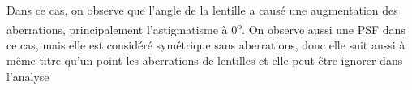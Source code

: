 \documentclass[11pt,letterpaper]{article}
\begin{document}
Dans ce cas, on observe que l'angle de  la lentille a causé une augmentation des aberrations, principalement l'astigmatisme à 0\textsuperscript{o}. On observe aussi une PSF dans ce cas, mais elle est considéré symétrique sans aberrations, donc elle suit aussi à même titre qu'un point les aberrations de lentilles et elle peut être ignorer dans l'analyse
\end{document}
